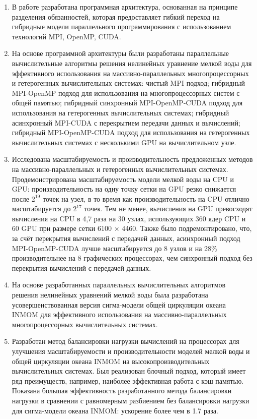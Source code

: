 \begin{enumerate}
\item В работе разработана программная архитектура, основанная на принципе разделения обязанностей, которая предоставляет гибкий переход на гибридные модели параллельного программирования с использованием технологий MPI, OpenMP, CUDA.
\item На основе программной архитектуры были разработаны параллельные вычислительные алгоритмы решения нелинейных уравнение мелкой воды для эффективного использования на массивно-параллельных многопроцессорных и гетерогенных вычислительных системах:
чистый MPI подход;
гибридный MPI-OpenMP подход для использования на многопроцессорных систем с общей памя­тью;
гибридный синхронный MPI-OpenMP-CUDA подход для использования на гетерогенных вычислительных системах;
гибридный асинхронный MPI-CUDA с перекрытием передачи данных и вычислений;
гибридный MPI-OpenMP-CUDA подход для использования на гетерогенных вычислительных системах с несколькими GPU на вычислительном узле.
\item Исследована масштабируемость и производительность предложенных методов на массивно-параллельных и гетерогенных вычислительных системах. Продемонстрирована масштабируемость модели мелкой воды на CPU и GPU: производительность на одну точку сетки на GPU резко снижается после $2^{19}$ точек на узел, в то время как производительность на CPU отлично масштабируется до $2^{17}$ точек. Тем не менее, вычисления на GPU превосходят вычисления на CPU в 4,7 раза на 30 узлах, использующих 360 ядер CPU и 60 GPU при размере сетки 6100 $\times$ 4460. Также было подремонтировано, что, за счёт перекрытия вычислений с передачей данных, асинхронный подход MPI-OpenMP-CUDA лучше масштабируется до 8 узлов и на 28\% производительнее на 8 графических процессорах, чем синхронный подход без перекрытия вычислений с передачей данных.
\item На основе разработанных параллельных вычислительных алгоритмов решения нелинейных уравнений мелкой воды была разработана усовершенствованная версия сигма-модели общей циркуляции океана INMOM для эффективного использования на массивно-параллельных многопроцессорных вычислительных системах.
\item Разработан метод балансировки нагрузки вычислений на процессорах для улучшения масштабируемости и производительности моделей мелкой воды и общей циркуляции океана INMOM на высокопроизводительных вычислительных системах. Был реализован блочный подход, который имеет ряд преимуществ, например, наиболее эффективная работа с кэш памятью. Показана большая эффективность разработанного метода балансировки нагрузки в сравнении с равномерным разбиением без балансировки нагрузки для сигма-модели океана INMOM: ускорение более чем в 1.7 раза.
\end{enumerate}

